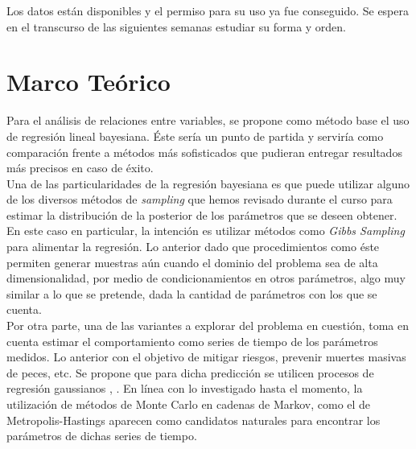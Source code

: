 \documentclass[letterpaper, 12pt]{article}
\begin{document}
Los datos están disponibles y el permiso para su uso ya fue conseguido. Se espera en el transcurso de las siguientes semanas estudiar su forma y orden.\\

\section{Marco Teórico}

Para el análisis de relaciones entre variables, se propone como método base el uso de regresión lineal bayesiana. Éste sería un punto de partida y serviría como comparación frente a métodos más sofisticados que pudieran entregar resultados más precisos en caso de éxito.\\

Una de las particularidades de la regresión bayesiana es que puede utilizar alguno de los diversos métodos de \textit{sampling} que hemos revisado durante el curso para estimar la distribución de la posterior de los parámetros que se deseen obtener. En este caso en particular, la intención es utilizar métodos como \textit{Gibbs Sampling} \cite{gibbs} para alimentar la regresión. Lo anterior dado que procedimientos como éste permiten generar muestras aún cuando el dominio del problema sea de alta dimensionalidad, por medio de condicionamientos en otros parámetros, algo muy similar a lo que se pretende, dada la cantidad de parámetros con los que se cuenta.\\

Por otra parte, una de las variantes a explorar del problema en cuestión, toma en cuenta estimar el comportamiento como series de tiempo de los parámetros medidos. Lo anterior con el objetivo de mitigar riesgos, prevenir muertes masivas de peces, etc. Se propone que para dicha predicción se utilicen procesos de regresión gaussianos \cite{gaussianmodels}, \cite{gaussianmodels2}. En línea con lo investigado hasta el momento, la utilización de métodos de Monte Carlo en cadenas de Markov, como el de Metropolis-Hastings aparecen como candidatos naturales para encontrar los parámetros de dichas series de tiempo.\\
\end{document}
